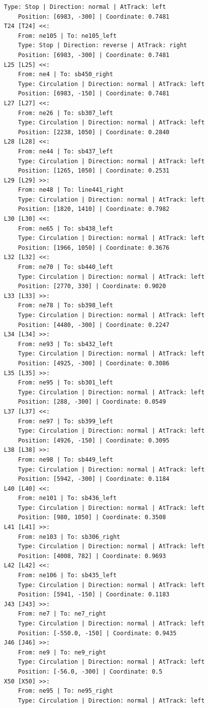 \begin{lstlisting}[language = {}, tabsize=4, basicstyle=\footnotesize\ttfamily, showspaces=false, showstringspaces=false, caption = Signalling.RNA, label = {lst:EJ3_6}]
	Type: Stop | Direction: normal | AtTrack: left 
	Position: [6983, -300] | Coordinate: 0.7481
T24 [T24] <<:
	From: ne105 | To: ne105_left
	Type: Stop | Direction: reverse | AtTrack: right 
	Position: [6983, -300] | Coordinate: 0.7481
L25 [L25] <<:
	From: ne4 | To: sb450_right
	Type: Circulation | Direction: normal | AtTrack: left 
	Position: [6983, -150] | Coordinate: 0.7481
L27 [L27] <<:
	From: ne26 | To: sb307_left
	Type: Circulation | Direction: normal | AtTrack: left 
	Position: [2238, 1050] | Coordinate: 0.2840
L28 [L28] <<:
	From: ne44 | To: sb437_left
	Type: Circulation | Direction: normal | AtTrack: left 
	Position: [1265, 1050] | Coordinate: 0.2531
L29 [L29] >>:
	From: ne48 | To: line441_right
	Type: Circulation | Direction: normal | AtTrack: left 
	Position: [1820, 1410] | Coordinate: 0.7982
L30 [L30] <<:
	From: ne65 | To: sb438_left
	Type: Circulation | Direction: normal | AtTrack: left 
	Position: [1966, 1050] | Coordinate: 0.3676
L32 [L32] <<:
	From: ne70 | To: sb440_left
	Type: Circulation | Direction: normal | AtTrack: left 
	Position: [2770, 330] | Coordinate: 0.9020
L33 [L33] >>:
	From: ne78 | To: sb398_left
	Type: Circulation | Direction: normal | AtTrack: left 
	Position: [4480, -300] | Coordinate: 0.2247
L34 [L34] >>:
	From: ne93 | To: sb432_left
	Type: Circulation | Direction: normal | AtTrack: left 
	Position: [4925, -300] | Coordinate: 0.3086
L35 [L35] >>:
	From: ne95 | To: sb301_left
	Type: Circulation | Direction: normal | AtTrack: left 
	Position: [288, -300] | Coordinate: 0.0549
L37 [L37] <<:
	From: ne97 | To: sb399_left
	Type: Circulation | Direction: normal | AtTrack: left 
	Position: [4926, -150] | Coordinate: 0.3095
L38 [L38] >>:
	From: ne98 | To: sb449_left
	Type: Circulation | Direction: normal | AtTrack: left 
	Position: [5942, -300] | Coordinate: 0.1184
L40 [L40] <<:	
	From: ne101 | To: sb436_left
	Type: Circulation | Direction: normal | AtTrack: left 
	Position: [980, 1050] | Coordinate: 0.3508
L41 [L41] >>:
	From: ne103 | To: sb306_right
	Type: Circulation | Direction: normal | AtTrack: left 
	Position: [4008, 782] | Coordinate: 0.9693
L42 [L42] <<:
	From: ne106 | To: sb435_left
	Type: Circulation | Direction: normal | AtTrack: left 
	Position: [5941, -150] | Coordinate: 0.1183
J43 [J43] >>:
	From: ne7 | To: ne7_right
	Type: Circulation | Direction: normal | AtTrack: left 
	Position: [-550.0, -150] | Coordinate: 0.9435
J46 [J46] >>:
	From: ne9 | To: ne9_right
	Type: Circulation | Direction: normal | AtTrack: left 
	Position: [-56.0, -300] | Coordinate: 0.5
X50 [X50] >>:
	From: ne95 | To: ne95_right
	Type: Circulation | Direction: normal | AtTrack: left 

\end{lstlisting}
